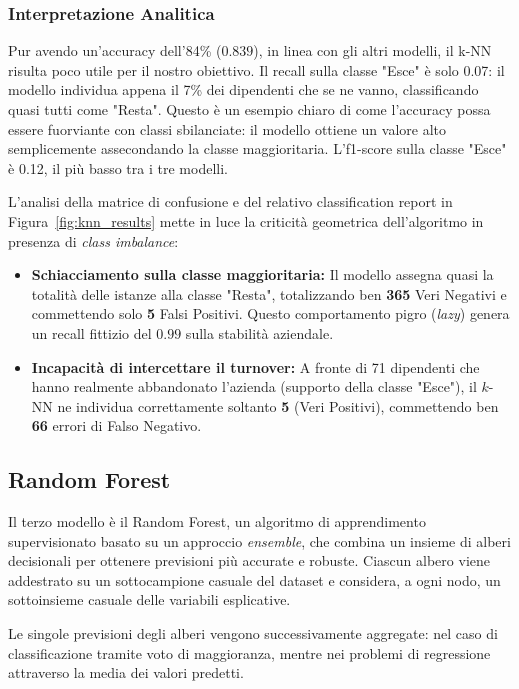\documentclass[11pt,a4paper]{article}
\begin{document}
\subsubsection{Interpretazione Analitica}
Pur avendo un'accuracy dell'84\% ($0.839$), in linea con gli altri modelli, il k-NN risulta poco utile per il nostro obiettivo. Il recall sulla classe "Esce" è solo 0.07: il modello individua appena il 7\% dei dipendenti che se ne vanno, classificando quasi tutti come "Resta". Questo è un esempio chiaro di come l'accuracy possa essere fuorviante con classi sbilanciate: il modello ottiene un valore alto semplicemente assecondando la classe maggioritaria. L'f1-score sulla classe "Esce" è 0.12, il più basso tra i tre modelli.

L'analisi della matrice di confusione e del relativo classification report in Figura~\ref{fig:knn_results} mette in luce la criticità geometrica dell'algoritmo in presenza di \textit{class imbalance}:
\begin{itemize}
    \item \textbf{Schiacciamento sulla classe maggioritaria:} Il modello assegna quasi la totalità delle istanze alla classe "Resta", totalizzando ben \textbf{365} Veri Negativi e commettendo solo \textbf{5} Falsi Positivi. Questo comportamento pigro (\textit{lazy}) genera un recall fittizio del $0.99$ sulla stabilità aziendale.
    \item \textbf{Incapacità di intercettare il turnover:} A fronte di 71 dipendenti che hanno realmente abbandonato l'azienda (supporto della classe "Esce"), il $k$-NN ne individua correttamente soltanto \textbf{5} (Veri Positivi), commettendo ben \textbf{66} errori di Falso Negativo. 
\end{itemize}


\subsection{Random Forest}

Il terzo modello è il Random Forest, un algoritmo di apprendimento supervisionato basato su un approccio \textit{ensemble}, che combina un insieme di alberi decisionali per ottenere previsioni più accurate e robuste. Ciascun albero viene addestrato su un sottocampione casuale del dataset e considera, a ogni nodo, un sottoinsieme casuale delle variabili esplicative.

Le singole previsioni degli alberi vengono successivamente aggregate: nel caso di classificazione tramite voto di maggioranza, mentre nei problemi di regressione attraverso la media dei valori predetti.
\end{document}
